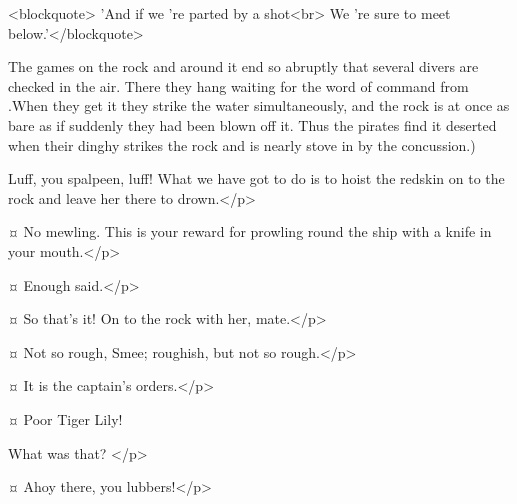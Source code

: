 \begin{drama}
<blockquote> 'And if we 're parted by a shot<br> We 're sure to meet below.'</blockquote>

\begin{stagedir}
The games on the rock and around it end so abruptly that several divers are checked in the air.
There they hang waiting for the word of command from \peter.When they get it they strike the water simultaneously, and the rock is at once as bare as if suddenly they had been blown off it.
Thus the pirates find it deserted when their dinghy strikes the rock and is nearly stove in by the concussion.)
\end{stagedir}

\smeespeaks
Luff, you spalpeen, luff!
What we have got to do is to hoist the redskin on to the rock and leave her there to drown.</p>


\starkeyspeaks {}¤
No mewling.
This is your reward for prowling round the ship with a knife in your mouth.</p>

\tigerlilyspeaks {}¤
Enough said.</p>

\smeespeaks {}¤
So that's it!
On to the rock with her, mate.</p>

\starkeyspeaks {}¤
Not so rough, Smee; roughish, but not so rough.</p>

\smeespeaks {}¤
It is the captain's orders.</p>


\wendyspeaks {}¤
Poor Tiger Lily!

\starkeyspeaks
What was that?
</p>

\peterspeaks {}¤
Ahoy there, you lubbers!</p>


\end{drama}
